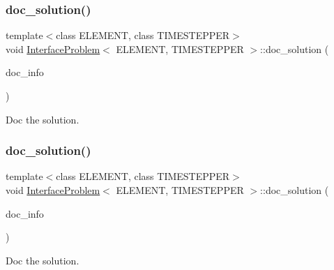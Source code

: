 \subsubsection{\texorpdfstring{doc\+\_\+solution()}{doc\_solution()}\hspace{0.1cm}{\footnotesize\ttfamily [2/3]}}
{\footnotesize\ttfamily template$<$class E\+L\+E\+M\+E\+NT, class T\+I\+M\+E\+S\+T\+E\+P\+P\+ER$>$ \\
void \hyperlink{classInterfaceProblem}{Interface\+Problem}$<$ E\+L\+E\+M\+E\+NT, T\+I\+M\+E\+S\+T\+E\+P\+P\+ER $>$\+::doc\+\_\+solution (\begin{DoxyParamCaption}\item[{Doc\+Info \&}]{doc\+\_\+info }\end{DoxyParamCaption})}



Doc the solution. 

\mbox{\label{classInterfaceProblem_a49714e35e94f7d2af0b6ddd22b851f52}} 
\subsubsection{\texorpdfstring{doc\+\_\+solution()}{doc\_solution()}\hspace{0.1cm}{\footnotesize\ttfamily [3/3]}}
{\footnotesize\ttfamily template$<$class E\+L\+E\+M\+E\+NT, class T\+I\+M\+E\+S\+T\+E\+P\+P\+ER$>$ \\
void \hyperlink{classInterfaceProblem}{Interface\+Problem}$<$ E\+L\+E\+M\+E\+NT, T\+I\+M\+E\+S\+T\+E\+P\+P\+ER $>$\+::doc\+\_\+solution (\begin{DoxyParamCaption}\item[{Doc\+Info \&}]{doc\+\_\+info }\end{DoxyParamCaption})}



Doc the solution. 

\mbox{\label{classInterfaceProblem_a5eb5fa3bf4e7884984f285e24ba3ee7b}} 
